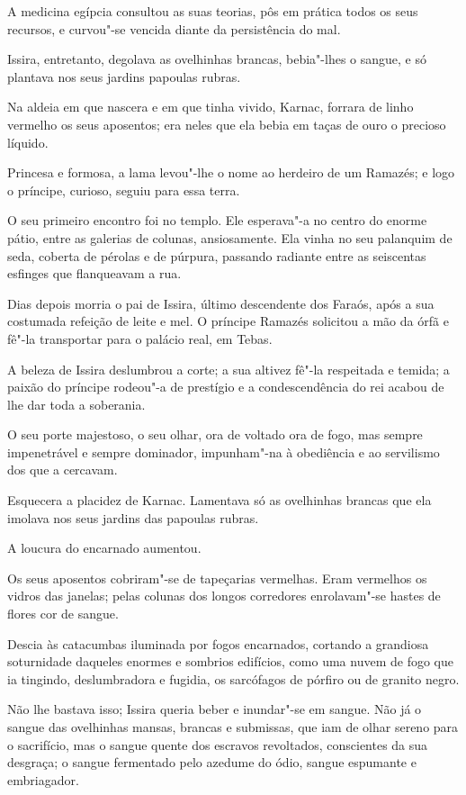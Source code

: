 A medicina egípcia consultou as suas teorias, pôs em prática todos os
seus recursos, e curvou"-se vencida diante da persistência do mal.

Issira, entretanto, degolava as ovelhinhas brancas, bebia"-lhes o sangue,
e só plantava nos seus jardins papoulas rubras.

Na aldeia em que nascera e em que tinha vivido, Karnac, forrara de linho
vermelho os seus aposentos; era neles que ela bebia em taças de ouro o
precioso líquido.

Princesa e formosa, a lama levou"-lhe o nome ao herdeiro de um Ramazés; e
logo o príncipe, curioso, seguiu para essa terra.

O seu primeiro encontro foi no templo. Ele esperava"-a no centro do
enorme pátio, entre as galerias de colunas, ansiosamente. Ela vinha no
seu palanquim de seda, coberta de pérolas e de púrpura, passando
radiante entre as seiscentas esfinges que flanqueavam a rua.

Dias depois morria o pai de Issira, último descendente dos Faraós, após
a sua costumada refeição de leite e mel. O príncipe Ramazés solicitou a
mão da órfã e fê"-la transportar para o palácio real, em Tebas.

A beleza de Issira deslumbrou a corte; a sua altivez fê"-la respeitada e
temida; a paixão do príncipe rodeou"-a de prestígio e a condescendência
do rei acabou de lhe dar toda a soberania.

O seu porte majestoso, o seu olhar, ora de voltado ora de fogo, mas
sempre impenetrável e sempre dominador, impunham"-na à obediência e ao
servilismo dos que a cercavam.

Esquecera a placidez de Karnac. Lamentava só as ovelhinhas brancas que
ela imolava nos seus jardins das papoulas rubras.

A loucura do encarnado aumentou.

Os seus aposentos cobriram"-se de tapeçarias vermelhas. Eram vermelhos os
vidros das janelas; pelas colunas dos longos corredores enrolavam"-se
hastes de flores cor de sangue.

Descia às catacumbas iluminada por fogos encarnados, cortando a
grandiosa soturnidade daqueles enormes e sombrios edifícios, como uma
nuvem de fogo que ia tingindo, deslumbradora e fugidia, os sarcófagos de
pórfiro ou de granito negro.

Não lhe bastava isso; Issira queria beber e inundar"-se em sangue. Não já
o sangue das ovelhinhas mansas, brancas e submissas, que iam de olhar
sereno para o sacrifício, mas o sangue quente dos escravos revoltados,
conscientes da sua desgraça; o sangue fermentado pelo azedume do ódio,
sangue espumante e embriagador.

